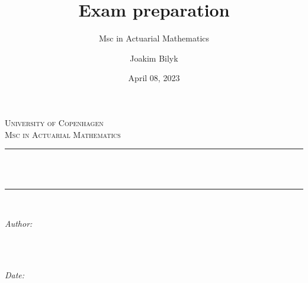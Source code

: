 \documentclass[
]{book}
\title{Exam preparation}
\subtitle{Msc in Actuarial Mathematics}
\author{Joakim Bilyk}
\date{April 08, 2023}
\begin{document}
\allowdisplaybreaks
\setlength{\abovedisplayskip}{10pt}
\setlength{\belowdisplayskip}{10pt}
\setlength{\abovedisplayshortskip}{-10pt}
\setlength{\belowdisplayshortskip}{0pt}



{
\begin{titlepage}
\newcommand{\HRule}{\rule{\linewidth}{0.5mm}} %

\center %
 

\textsc{\LARGE University of Copenhagen}\\[4cm] %
\textsc{\Large Msc in Actuarial Mathematics}\\[0.5cm] %


\HRule \\[0.4cm]
{ \huge \bfseries \thetitle}\\[0.4cm] %
\HRule \\[1.5cm]
 

\begin{minipage}{0.4\textwidth}
\begin{flushleft} \large
\emph{Author:}\\
\textsc{\theauthor} \\
\end{flushleft}
\end{minipage}
~
\begin{minipage}{0.4\textwidth}
\begin{flushright} \large
\emph{Date:} \\
\textsc{\thedate} \\
\end{flushright}
\end{minipage}\\[2cm]


\end{titlepage}}
\end{document}
